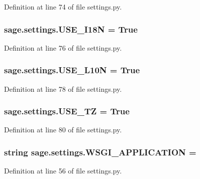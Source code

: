 Definition at line 74 of file settings.\+py.

\hypertarget{namespacesage_1_1settings_acf5dd02a352695a98f57bef7679a29af}{}
\subsubsection[{U\+S\+E\+\_\+\+I18\+N}]{\setlength{\rightskip}{0pt plus 5cm}sage.\+settings.\+U\+S\+E\+\_\+\+I18\+N = True}\label{namespacesage_1_1settings_acf5dd02a352695a98f57bef7679a29af}


Definition at line 76 of file settings.\+py.

\hypertarget{namespacesage_1_1settings_a9d0e7298d4688c99e0ee9e965d950de0}{}
\subsubsection[{U\+S\+E\+\_\+\+L10\+N}]{\setlength{\rightskip}{0pt plus 5cm}sage.\+settings.\+U\+S\+E\+\_\+\+L10\+N = True}\label{namespacesage_1_1settings_a9d0e7298d4688c99e0ee9e965d950de0}


Definition at line 78 of file settings.\+py.

\hypertarget{namespacesage_1_1settings_aa385f778cd7bd79cc4c688fec7c101a2}{}
\subsubsection[{U\+S\+E\+\_\+\+T\+Z}]{\setlength{\rightskip}{0pt plus 5cm}sage.\+settings.\+U\+S\+E\+\_\+\+T\+Z = True}\label{namespacesage_1_1settings_aa385f778cd7bd79cc4c688fec7c101a2}


Definition at line 80 of file settings.\+py.

\hypertarget{namespacesage_1_1settings_a700b653427cc28bc1ebe951b419cfd58}{}
\subsubsection[{W\+S\+G\+I\+\_\+\+A\+P\+P\+L\+I\+C\+A\+T\+I\+O\+N}]{\setlength{\rightskip}{0pt plus 5cm}string sage.\+settings.\+W\+S\+G\+I\+\_\+\+A\+P\+P\+L\+I\+C\+A\+T\+I\+O\+N = \textquotesingle{}}\label{namespacesage_1_1settings_a700b653427cc28bc1ebe951b419cfd58}


Definition at line 56 of file settings.\+py.

